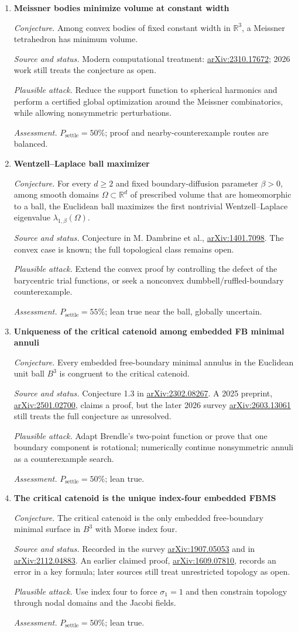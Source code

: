 \documentclass[11pt]{article}
\newcommand{\cand}[5]{%
  \item \textbf{#1}\par
  \emph{Conjecture.} #2\par
  \emph{Source and status.} #3\par
  \emph{Plausible attack.} #4\par
  \emph{Assessment.} #5
}
\newcommand{\psettle}{P_{\mathrm{settle}}}
\begin{document}
\begin{enumerate}[label=\textbf{M\arabic*.}]
\cand{Meissner bodies minimize volume at constant width}
{Among convex bodies of fixed constant width in $\mathbb R^3$, a Meissner tetrahedron has minimum volume.}
{Modern computational treatment: \href{https://arxiv.org/abs/2310.17672}{arXiv:2310.17672}; 2026 work still treats the conjecture as open.}
{Reduce the support function to spherical harmonics and perform a certified global optimization around the Meissner combinatorics, while allowing nonsymmetric perturbations.}
{$\psettle=50\%$; proof and nearby-counterexample routes are balanced.}

\cand{Wentzell--Laplace ball maximizer}
{For every $d\ge2$ and fixed boundary-diffusion parameter $\beta>0$, among smooth domains $\Omega\subset\mathbb R^d$ of prescribed volume that are homeomorphic to a ball, the Euclidean ball maximizes the first nontrivial Wentzell--Laplace eigenvalue $\lambda_{1,\beta}(\Omega)$.}
{Conjecture in M. Dambrine et al., \href{https://arxiv.org/abs/1401.7098}{arXiv:1401.7098}.  The convex case is known; the full topological class remains open.}
{Extend the convex proof by controlling the defect of the barycentric trial functions, or seek a nonconvex dumbbell/ruffled-boundary counterexample.}
{$\psettle=55\%$; lean true near the ball, globally uncertain.}

\cand{Uniqueness of the critical catenoid among embedded FB minimal annuli}
{Every embedded free-boundary minimal annulus in the Euclidean unit ball $B^3$ is congruent to the critical catenoid.}
{Conjecture 1.3 in \href{https://arxiv.org/abs/2302.08267}{arXiv:2302.08267}.  A 2025 preprint, \href{https://arxiv.org/abs/2501.02700}{arXiv:2501.02700}, claims a proof, but the later 2026 survey \href{https://arxiv.org/abs/2603.13061}{arXiv:2603.13061} still treats the full conjecture as unresolved.}
{Adapt Brendle's two-point function or prove that one boundary component is rotational; numerically continue nonsymmetric annuli as a counterexample search.}
{$\psettle=50\%$; lean true.}

\cand{The critical catenoid is the unique index-four embedded FBMS}
{The critical catenoid is the only embedded free-boundary minimal surface in $B^3$ with Morse index four.}
{Recorded in the survey \href{https://arxiv.org/abs/1907.05053}{arXiv:1907.05053} and in \href{https://arxiv.org/abs/2112.04883}{arXiv:2112.04883}.  An earlier claimed proof, \href{https://arxiv.org/abs/1609.07810}{arXiv:1609.07810}, records an error in a key formula; later sources still treat unrestricted topology as open.}
{Use index four to force $\sigma_1=1$ and then constrain topology through nodal domains and the Jacobi fields.}
{$\psettle=50\%$; lean true.}


\end{enumerate}
\end{document}
